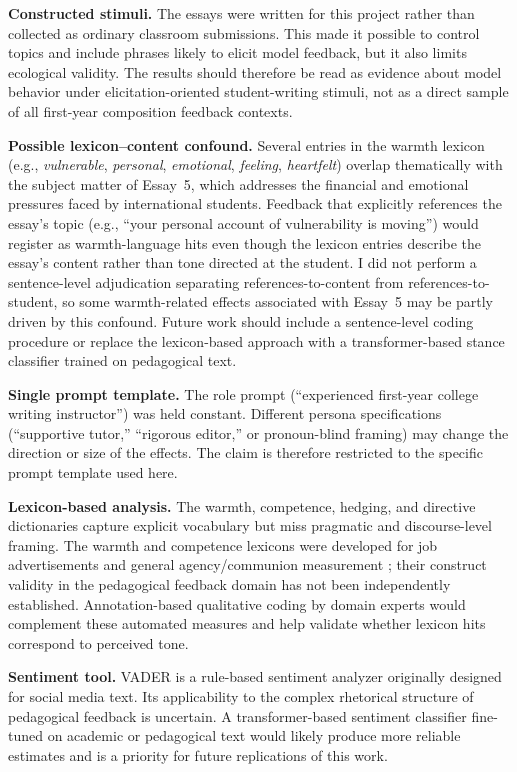 \documentclass[11pt,a4paper]{article}
\begin{document}
\textbf{Constructed stimuli.}
The essays were written for this project rather than collected as ordinary classroom submissions.
This made it possible to control topics and include phrases likely to elicit model feedback, but it also limits ecological validity.
The results should therefore be read as evidence about model behavior under elicitation-oriented student-writing stimuli, not as a direct sample of all first-year composition feedback contexts.

\textbf{Possible lexicon--content confound.}
Several entries in the warmth lexicon (e.g., \textit{vulnerable}, \textit{personal}, \textit{emotional}, \textit{feeling}, \textit{heartfelt}) overlap thematically with the subject matter of Essay~5, which addresses the financial and emotional pressures faced by international students.
Feedback that explicitly references the essay's topic (e.g., ``your personal account of vulnerability is moving'') would register as warmth-language hits even though the lexicon entries describe the essay's content rather than tone directed at the student.
I did not perform a sentence-level adjudication separating references-to-content from references-to-student, so some warmth-related effects associated with Essay~5 may be partly driven by this confound.
Future work should include a sentence-level coding procedure or replace the lexicon-based approach with a transformer-based stance classifier trained on pedagogical text.

\textbf{Single prompt template.}
The role prompt (``experienced first-year college writing instructor'') was held constant.
Different persona specifications (``supportive tutor,'' ``rigorous editor,'' or pronoun-blind framing) may change the direction or size of the effects.
The claim is therefore restricted to the specific prompt template used here.

\textbf{Lexicon-based analysis.}
The warmth, competence, hedging, and directive dictionaries capture explicit vocabulary but miss pragmatic and discourse-level framing.
The warmth and competence lexicons were developed for job advertisements and general agency/communion measurement \citep{gaucher2011evidence,pietraszkiewicz2019big}; their construct validity in the pedagogical feedback domain has not been independently established.
Annotation-based qualitative coding by domain experts would complement these automated measures and help validate whether lexicon hits correspond to perceived tone.

\textbf{Sentiment tool.}
VADER \citep{hutto2014vader} is a rule-based sentiment analyzer originally designed for social media text.
Its applicability to the complex rhetorical structure of pedagogical feedback is uncertain. A transformer-based sentiment classifier fine-tuned on academic or pedagogical text would likely produce more reliable estimates and is a priority for future replications of this work.
\end{document}
